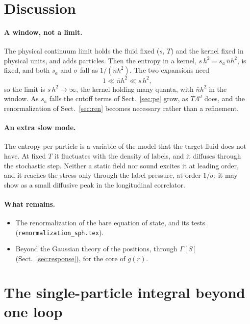 \documentclass[11pt,aps,preprint,nofootinbib,superscriptaddress,tightenlines]{revtex4-2}
\def\st{\begin{equation}}
\def\stp{\end{equation}}
\def\Sect#1{Sect.~\ref{#1}}
\let\oldparagraph\paragraph
\renewcommand{\paragraph}{\par\bigskip\oldparagraph}
\begin{document}
\section{Discussion}
\label{sec:discussion}

\paragraph{A window, not a limit.}  The physical continuum limit holds the fluid fixed ($s$, $T$) and the kernel fixed in physical units, and adds particles.
Then the entropy in a kernel, $s\,h^2=s_a\,\bar nh^2$, is fixed, and both $s_a$ and $\sigma$ fall as $1/(\bar nh^2)$.  The two expansions need
\st
1\ll\bar nh^2\ll s\,h^2 ,
\stp
so the limit is $s\,h^2\to\infty$, the kernel holding many quanta, with $\bar nh^2$ in the window.  As $s_a$ falls the cutoff terms of \Sect{sec:pe} grow, as
$T\Lambda^d$ does, and the renormalization of \Sect{sec:ren} becomes necessary rather than a refinement.

\paragraph{An extra slow mode.}  The entropy per particle is a variable of the model that the target fluid does not have.  At fixed $T$ it fluctuates with the
density of labels, and it diffuses through the stochastic step.  Neither a static field nor sound excites it at leading order, and it reaches the stress only
through the label pressure, at order $1/\sigma$; it may show as a small diffusive peak in the longitudinal correlator.

\paragraph{What remains.}
\begin{itemize}
\item The renormalization of the bare equation of state, and its tests (\nolinkurl{renormalization_sph.tex}).
\item Beyond the Gaussian theory of the positions, through $\Gamma[S]$ (\Sect{sec:response}), for the core of $g(r)$.
\end{itemize}

\appendix

\section{The single-particle integral beyond one loop}
\label{app:single}
\end{document}
